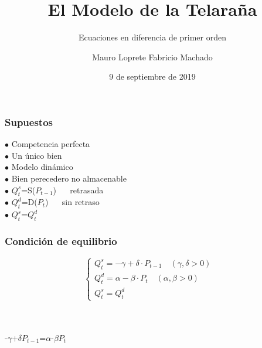 \documentclass[11pt]{beamer}
\begin{document}
	\author{Mauro Loprete Fabricio Machado}
	\title{El Modelo de la Telaraña}
	\subtitle{Ecuaciones en diferencia de primer orden}
	\date{9 de septiembre de 2019}
	\subject{Cálculo 3}
	\begin{frame}
	\maketitle
	\end{frame}
\begin{frame}
\frametitle{Supuestos}
	$\bullet$ Competencia perfecta
	\\
	$\bullet$ Un único bien
	\\
	$\bullet$ Modelo dinámico
	\\
	$\bullet$ Bien perecedero no almacenable
	\\
	$\bullet$ $Q^s_t$=S($P_{t-1}$) $\quad$ retrasada
	\\	
	$\bullet$ $Q^d_t$=D($P_t$) $\quad$  sin retraso
	\\
	$\bullet$ $Q^s_t$=$Q^d_t$
\end{frame}
\begin{frame}
\frametitle{Condición de equilibrio}
\begin{equation*}
\left\{\begin{matrix}
Q^{s}_{t}=-\gamma+\delta\cdot P_{t-1} \quad (\gamma,\delta >0)
	& \\ Q^{d}_{t}=\alpha-\beta\cdot P_{t}  \quad   (\alpha,\beta>0)
	& \\ Q^{s}_{t}=Q^{d}_{t}
\end{matrix}\right.
\end{equation*}
\\
~
\begin{block}{}
	\begin{center}
		-$\gamma$+$\delta$$P_{t-1}$=$\alpha$-$\beta$$P_t$
	\end{center}
\end{block}
\end{frame}
\end{document}
